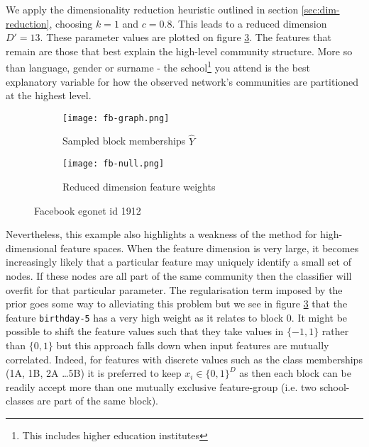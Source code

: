 We apply the dimensionality reduction heuristic outlined in section \ref{sec:dim-reduction}, choosing $k=1$ and $c=0.8$. This leads to a reduced dimension $D'=13$. These parameter values are plotted on figure \ref{fig:fb-null}. The features that remain are those that best explain the high-level community structure. More so than language, gender or surname - the school\footnote{This includes higher education institutes} you attend is the best explanatory variable for how the observed network's communities are partitioned at the highest level. 
%
\begin{figure}[!h]
	\centering
	\begin{subfigure}{0.45\linewidth}
		\centering
		\texttt{[image: fb-graph.png]}
		\caption{Sampled block memberships $\hat{Y}$}
		\label{fig:fb-graph}
	\end{subfigure}
	\hfill
	\begin{subfigure}{0.45\linewidth}
		\centering
		\texttt{[image: fb-null.png]}
		\caption{Reduced dimension feature weights}
		\label{fig:fb-null}
	\end{subfigure}
	\caption{Facebook egonet id 1912 \cite{fb-snap}}
\end{figure}

Nevertheless, this example also highlights a weakness of the method for high-dimensional feature spaces. When the feature dimension is very large, it becomes increasingly likely that a particular feature may uniquely identify a small set of nodes. If these nodes are all part of the same community then the classifier will overfit for that particular parameter. The regularisation term imposed by the prior goes some way to alleviating this problem but we see in figure \ref{fig:fb-null} that the feature \verb*|birthday-5| has a very high weight as it relates to block 0. It might be possible to shift the feature values such that they take values in $\{-1, 1\}$ rather than $\{0, 1\}$ but this approach falls down when input features are mutually correlated. Indeed, for features with discrete values such as the class memberships (1A, 1B, 2A \dots 5B) it is preferred to keep $x_i \in \{0, 1\}^D$ as then each block can be readily accept more than one mutually exclusive feature-group (i.e. two school-classes are part of the same block).

